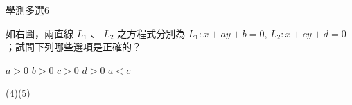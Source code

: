     \begin{QUESTION}
        \begin{ExamInfo}{92}{學測}{多選}{6}
        \end{ExamInfo}
        \begin{ExamAnsRateInfo}{41}{71}{40}{12}
        \end{ExamAnsRateInfo}
        \begin{QBODY}
            如右圖，兩直線 $L_1$ 、 $L_2$ 之方程式分別為 $L_1 : x+ay+b=0$, $L_2 :x+cy+d=0$；試問下列哪些選項是正確的？ 
            \begin{QOPS} 
                \QOP $a>0$ 
                \QOP $b>0$ 
                \QOP $c>0$ 
                \QOP $d>0$ 
                \QOP $a<c$ 
            \end{QOPS}
            
        \end{QBODY}
        \begin{QFROMS}
        \end{QFROMS}
        \begin{QTAGS}\end{QTAGS}
        \begin{QANS}
            (4)(5)
        \end{QANS}
        \begin{QSOLLIST}
        \end{QSOLLIST}
        \begin{QEMPTYSPACE}
        \end{QEMPTYSPACE}
    \end{QUESTION}
